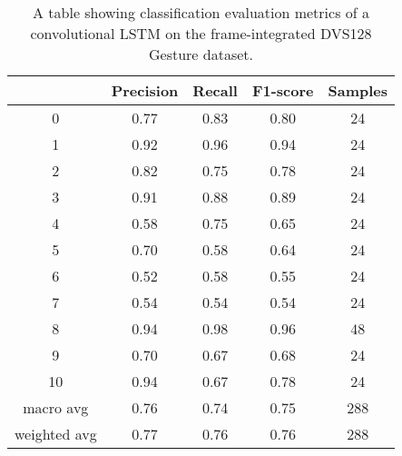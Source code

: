 \begin{table}[htb]
    \centering
    \begin{tabular}{|| c | c | c | c | c ||}
        \hline
             & Precision & Recall & F1-score & Samples \\
        \hline
        \hline
        0            & 0.77 & 0.83 & 0.80 & 24  \\
        \hline
        1            & 0.92 & 0.96 & 0.94 & 24  \\
        \hline
        2            & 0.82 & 0.75 & 0.78 & 24  \\
        \hline
        3            & 0.91 & 0.88 & 0.89 & 24  \\
        \hline
        4            & 0.58 & 0.75 & 0.65 & 24  \\
        \hline
        5            & 0.70 & 0.58 & 0.64 & 24  \\
        \hline
        6            & 0.52 & 0.58 & 0.55 & 24  \\
        \hline
        7            & 0.54 & 0.54 & 0.54 & 24  \\
        \hline
        8            & 0.94 & 0.98 & 0.96 & 48  \\
        \hline
        9            & 0.70 & 0.67 & 0.68 & 24  \\
        \hline
        10           & 0.94 & 0.67 & 0.78 & 24  \\
        \hline
        macro avg    & 0.76 & 0.74 & 0.75 & 288 \\
        \hline
        weighted avg & 0.77 & 0.76 & 0.76 & 288 \\
        \hline
    \end{tabular}
    \caption{A table showing classification evaluation metrics of a convolutional LSTM on the frame-integrated DVS128 Gesture dataset.}
    \label{tab:custom_conv_lstm_dvs128_evaluation_metrics}
\end{table}

